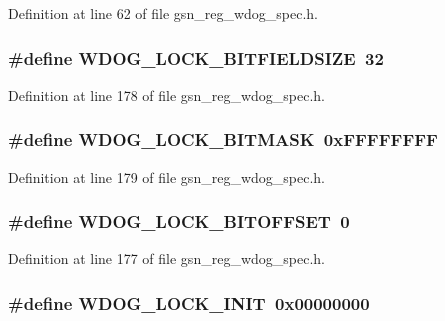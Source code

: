 Definition at line 62 of file gsn\_\-reg\_\-wdog\_\-spec.h.

\hypertarget{a00577_ad2d78e2c8ba5209b19df49da4c5b4b67}{
\subsubsection[{WDOG\_\-LOCK\_\-BITFIELDSIZE}]{\setlength{\rightskip}{0pt plus 5cm}\#define WDOG\_\-LOCK\_\-BITFIELDSIZE~32}}
\label{a00577_ad2d78e2c8ba5209b19df49da4c5b4b67}


Definition at line 178 of file gsn\_\-reg\_\-wdog\_\-spec.h.

\hypertarget{a00577_a6e1dab22db0cdd64db7267f7fe4ba9ef}{
\subsubsection[{WDOG\_\-LOCK\_\-BITMASK}]{\setlength{\rightskip}{0pt plus 5cm}\#define WDOG\_\-LOCK\_\-BITMASK~0xFFFFFFFF}}
\label{a00577_a6e1dab22db0cdd64db7267f7fe4ba9ef}


Definition at line 179 of file gsn\_\-reg\_\-wdog\_\-spec.h.

\hypertarget{a00577_aaa012f010102c750c84ec6deed629f76}{
\subsubsection[{WDOG\_\-LOCK\_\-BITOFFSET}]{\setlength{\rightskip}{0pt plus 5cm}\#define WDOG\_\-LOCK\_\-BITOFFSET~0}}
\label{a00577_aaa012f010102c750c84ec6deed629f76}


Definition at line 177 of file gsn\_\-reg\_\-wdog\_\-spec.h.

\hypertarget{a00577_ac24786088a3d018ef910eafc93e87eea}{
\subsubsection[{WDOG\_\-LOCK\_\-INIT}]{\setlength{\rightskip}{0pt plus 5cm}\#define WDOG\_\-LOCK\_\-INIT~0x00000000}}
\label{a00577_ac24786088a3d018ef910eafc93e87eea}


